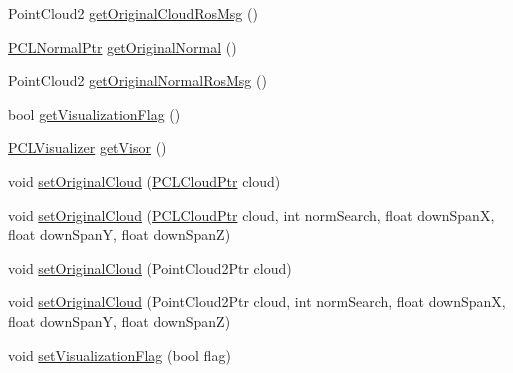 \begin{DoxyCompactItemize}
\item 
Point\-Cloud2 \hyperlink{classpcm_1_1PCManager_a1a11270e78e96c38f9c40985529fc5b6}{get\-Original\-Cloud\-Ros\-Msg} ()
\item 
\hyperlink{PCPrimitive_8h_a1bc38ce8b0c26e5f2d28fae9f3e3ea97}{P\-C\-L\-Normal\-Ptr} \hyperlink{classpcm_1_1PCManager_a471d768a4a32a8d8992c688fc6fc2f58}{get\-Original\-Normal} ()
\item 
Point\-Cloud2 \hyperlink{classpcm_1_1PCManager_a01a64a81b18e5bc984c46910d2a881be}{get\-Original\-Normal\-Ros\-Msg} ()
\item 
bool \hyperlink{classpcm_1_1PCManager_a4d419e1bf7e35f8f3ddbb7f640c50a72}{get\-Visualization\-Flag} ()
\item 
\hyperlink{PCManager_8h_a38c805dbc7ad6f06109b85c8e540817a}{P\-C\-L\-Visualizer} \hyperlink{classpcm_1_1PCManager_ac1cfd8753c305e761a3c5914f74cca7b}{get\-Visor} ()
\item 
void \hyperlink{classpcm_1_1PCManager_a2144cf37b92d58e902f7e6b1dcb6984d}{set\-Original\-Cloud} (\hyperlink{PCPrimitive_8h_aa14a240c8d999c4f56133c0f70e88783}{P\-C\-L\-Cloud\-Ptr} cloud)
\item 
void \hyperlink{classpcm_1_1PCManager_ac277411304ee22415cdeaad26cd4721c}{set\-Original\-Cloud} (\hyperlink{PCPrimitive_8h_aa14a240c8d999c4f56133c0f70e88783}{P\-C\-L\-Cloud\-Ptr} cloud, int norm\-Search, float down\-Span\-X, float down\-Span\-Y, float down\-Span\-Z)
\item 
void \hyperlink{classpcm_1_1PCManager_a8eafedbcc9cb93380e826bc45bff1410}{set\-Original\-Cloud} (Point\-Cloud2\-Ptr cloud)
\item 
void \hyperlink{classpcm_1_1PCManager_aa5bd3ef55ff3ef39cded25351c7b4d9e}{set\-Original\-Cloud} (Point\-Cloud2\-Ptr cloud, int norm\-Search, float down\-Span\-X, float down\-Span\-Y, float down\-Span\-Z)
\item 
void \hyperlink{classpcm_1_1PCManager_a40c79e3197147779d263b95fd3617974}{set\-Visualization\-Flag} (bool flag)
\end{DoxyCompactItemize}
